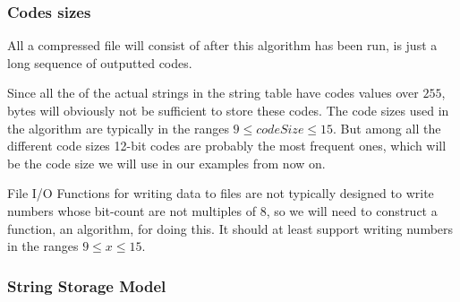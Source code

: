 \begin{refsection}
\begin{algorithm}[H]
\begin{algorithmic}[1]
    \While{\neof}

       \label{algl:hasingcheckintable}
         \label{algl:hasgetcode}
      \Else
        \State {}


          \State {}\label{algl:hashadd}

        \EndIf


      \EndIf


    \EndWhile

    \State {}
    \State {}

  \end{algorithmic}
\end{algorithm}

\subsubsection{Codes sizes}

All a \lzw compressed file will consist of after this algorithm has
been run, is just a long sequence of outputted codes.

Since all the of the actual strings in the string table have codes
values over $255$, bytes will obviously not be sufficient to store
these codes. The code sizes used in the \lzw
algorithm are typically in the ranges $9 \leq codeSize \leq 15$. But
among all the different code sizes 12-bit codes are probably the most
frequent ones, which will be the code size we will use in our examples from
now on.

File I/O Functions for writing data to files are not typically
designed to write numbers whose bit-count are not multiples of 8, so
we will need to construct a function, an algorithm, for doing this. It
should at least support writing numbers in the ranges  $9 \leq x \leq 15$.


\subsubsection{String Storage Model}


\end{refsection}
